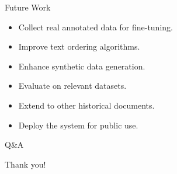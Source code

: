 \documentclass{beamer}
\begin{document}
\begin{frame}
    \begin{center}
        \Large{Future Work}
    \end{center}
    \begin{itemize}
        \item Collect real annotated data for fine-tuning.
        \item Improve text ordering algorithms.
        \item Enhance synthetic data generation.
        \item Evaluate on relevant datasets.
        \item Extend to other historical documents.
        \item Deploy the system for public use.
    \end{itemize}
\end{frame}

\begin{frame}
    \begin{center}
        \Huge{Q\&A}
    \end{center}
\end{frame}

\begin{frame}
    \begin{center}
        \Huge{Thank you!}
    \end{center}
\end{frame}
\end{document}
